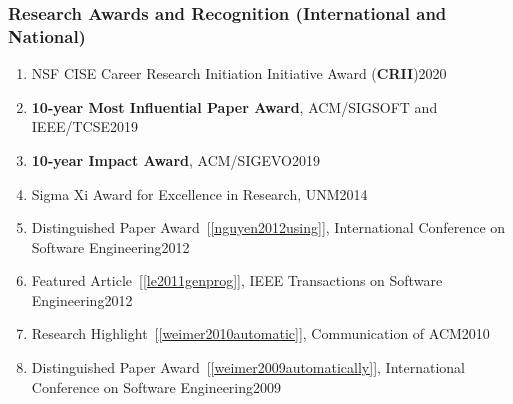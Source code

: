 \documentclass[11pt]{article}
\begin{document}
\subsubsection{Research Awards and Recognition (International and National)}

\begin{enumerate}
\item NSF CISE Career Research Initiation Initiative Award (\textbf{CRII})\hfill 2020
  
\item \textbf{10-year Most Influential Paper Award}, ACM/SIGSOFT and IEEE/TCSE\hfill 2019

  
\item \textbf{10-year Impact Award}, ACM/SIGEVO\hfill 2019

\item  Sigma Xi Award for Excellence in Research, UNM\hfill 2014

\item Distinguished Paper Award~[\ref{nguyen2012using}], International Conference on Software Engineering\hfill 2012

\item Featured Article~[\ref{le2011genprog}], IEEE Transactions on Software Engineering\hfill 2012

\item Research Highlight~[\ref{weimer2010automatic}], Communication of ACM\hfill 2010

\item Distinguished Paper Award~[\ref{weimer2009automatically}], International Conference on Software Engineering\hfill 2009 


\end{enumerate}
\end{document}

